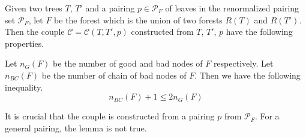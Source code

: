 \begin{lem}\label{eq.ineqn_BCn_G} Given two trees $T$, $T'$ and a pairing $p\in\mathcal{P}_F$ of leaves in the renormalized pairing set $\mathcal{P}_F$, let $F$ be the forest which is the union of two forests $R(T)$ and $R(T')$. Then the couple $\mathcal{C} = \mathcal{C}(T,T',p)$ constructed from $T$, $T'$, $p$ have the following properties.


Let $n_{G}(F)$ be the number of good and bad nodes of $F$ respectively. Let $n_{BC}(F)$ be the number of chain of bad nodes of $F$. Then we have the following inequality.
\begin{equation}\label{eq.n_Bn_G}
    n_{BC}(F) + 1 \le 2n_{G}(F)
\end{equation}
\end{lem}
\begin{rem}
It is crucial that the couple is constructed from a pairing $p$ from $\mathcal{P}_F$. For a general pairing, the lemma is not true.
\end{rem}

